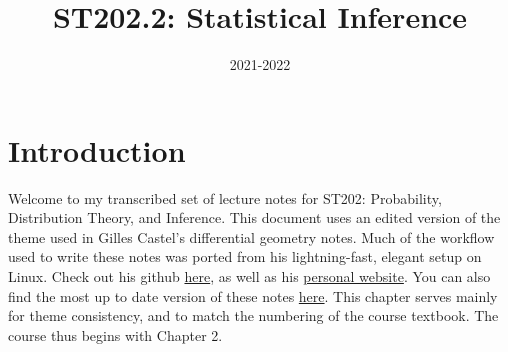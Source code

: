 \documentclass[a4paper]{report}
\title{\Huge\textsf{ST202.2: Statistical Inference}}
\affil{\vskip.5cm\textsf{The London School of Economics and Political Science}}
\date{\textsf{2021-2022}}
\begin{document}
    \maketitle
    \tableofcontents
	\clearpage
\chapter{Introduction}
Welcome to my transcribed set of lecture notes for ST202: Probability, Distribution Theory, and Inference. This document uses an edited version of the theme used in Gilles Castel's differential geometry notes. Much of the workflow used to write these notes was ported from his lightning-fast, elegant setup on Linux. Check out his github \href{https://github.com/gillescastel}{here}, as well as his \href{https://castel.dev/}{personal website}. You can also find the most up to date version of these notes \href{https://github.com/meshkinyar/lecture-notes/tree/main/st202}{here}. This chapter serves mainly for theme consistency, and to match the numbering of the course textbook. The course thus begins with Chapter 2.
    
    
    
    
    
    
    
    
    
    
    
    
    
    
    
    
    
    
    
    
    
\end{document}
